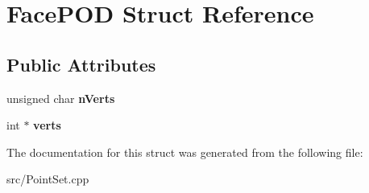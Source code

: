 \hypertarget{structFacePOD}{\section{Face\-P\-O\-D Struct Reference}
\label{structFacePOD}
}
\subsection*{Public Attributes}
\begin{DoxyCompactItemize}
\item 
\hypertarget{structFacePOD_a546069b25daedbfd6de63e0280514026}{unsigned char {\bfseries n\-Verts}}\label{structFacePOD_a546069b25daedbfd6de63e0280514026}

\item 
\hypertarget{structFacePOD_a878bc3da31fb37c0a2eeaa03bf98db53}{int $\ast$ {\bfseries verts}}\label{structFacePOD_a878bc3da31fb37c0a2eeaa03bf98db53}

\end{DoxyCompactItemize}


The documentation for this struct was generated from the following file\-:\begin{DoxyCompactItemize}
\item 
src/Point\-Set.\-cpp\end{DoxyCompactItemize}
